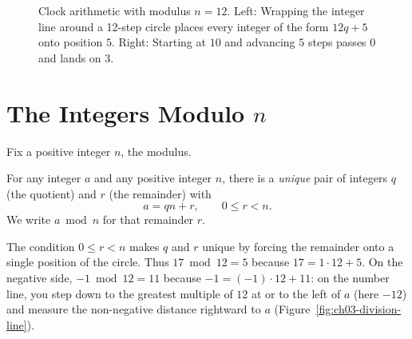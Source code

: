 \begin{figure}[htbp]
\caption{Clock arithmetic with modulus $n = 12$. Left: Wrapping the integer line around a 12-step circle places every integer of the form $12q + 5$ onto position $5$. Right: Starting at $10$ and advancing $5$ steps passes $0$ and lands on $3$.}
\label{ch03:clock}
\end{figure}

\section{The Integers Modulo \texorpdfstring{$n$}{n}}

Fix a positive integer $n$, the modulus.

\begin{definition}
\label{ch03:division}
For any integer $a$ and any positive integer $n$, there is a \emph{unique} pair of integers $q$ (the quotient) and $r$ (the remainder) with
\[
  a = qn + r, \qquad 0 \le r < n.
\]
We write $a \bmod n$ for that remainder $r$.
\end{definition}

The condition $0 \le r < n$ makes $q$ and $r$ unique by forcing the remainder onto a single position of the circle. Thus $17 \bmod 12 = 5$ because $17 = 1\cdot 12 + 5$. On the negative side, $-1 \bmod 12 = 11$ because $-1 = (-1)\cdot 12 + 11$: on the number line, you step down to the greatest multiple of $12$ at or to the left of $a$ (here $-12$) and measure the non-negative distance rightward to $a$ (Figure~\ref{fig:ch03-division-line}).

